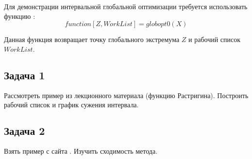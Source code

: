 Для демонстрации интервальной глобальной оптимизации требуется использовать функцию \cite{globopt}:
\begin{equation}
	function [Z, WorkList] = globopt0(X)
\end{equation}

Данная функция возвращает точку глобального экстремума $Z$ и рабочий список $WorkList$.

\subsection{Задача 1}
Рассмотреть пример из лекционного материала (функцию Растригина). Построить рабочий список и график сужения интервала.

\subsection{Задача 2}
Взять пример с сайта \cite{optfunc}. Изучить сходимость метода.